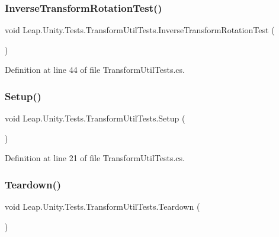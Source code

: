 \subsubsection{\texorpdfstring{InverseTransformRotationTest()}{InverseTransformRotationTest()}}
{\footnotesize\ttfamily void Leap.\+Unity.\+Tests.\+Transform\+Util\+Tests.\+Inverse\+Transform\+Rotation\+Test (\begin{DoxyParamCaption}{ }\end{DoxyParamCaption})}



Definition at line 44 of file Transform\+Util\+Tests.\+cs.

\mbox{\label{class_leap_1_1_unity_1_1_tests_1_1_transform_util_tests_abf48c82570a14d1f7afda726811af176}} 
\subsubsection{\texorpdfstring{Setup()}{Setup()}}
{\footnotesize\ttfamily void Leap.\+Unity.\+Tests.\+Transform\+Util\+Tests.\+Setup (\begin{DoxyParamCaption}{ }\end{DoxyParamCaption})}



Definition at line 21 of file Transform\+Util\+Tests.\+cs.

\mbox{\label{class_leap_1_1_unity_1_1_tests_1_1_transform_util_tests_adb2d1af83326a798e02e511671c97622}} 
\subsubsection{\texorpdfstring{Teardown()}{Teardown()}}
{\footnotesize\ttfamily void Leap.\+Unity.\+Tests.\+Transform\+Util\+Tests.\+Teardown (\begin{DoxyParamCaption}{ }\end{DoxyParamCaption})}



